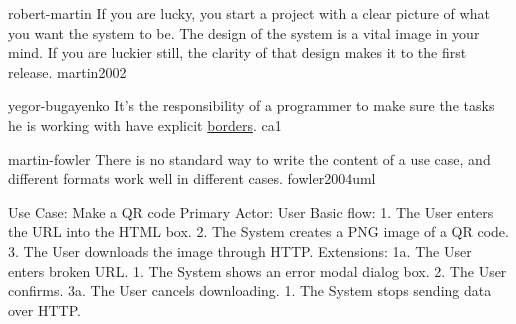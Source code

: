 \documentclass{article}
\begin{document}

\lnQuote
  {robert-martin}
  {If you are lucky, you start a project with a clear picture of what you want the system to be. The design of the system is a vital image in your mind. If you are luckier still, the clarity of that design makes it to the first release.}
  {martin2002}

\lnQuote
  {yegor-bugayenko}
  {It's the responsibility of a programmer to make sure the tasks he is working with have explicit \ul{borders}.}
  {ca1}

\pptToc



\lnQuote
  {martin-fowler}
  {There is no standard way to write the content of a use case, and different formats work well in different cases.}
  {fowler2004uml}

\begin{lnSnippet}
Use Case: Make a QR code
Primary Actor: User
Basic flow:
  1. The User enters the URL into the HTML box.
  2. The System creates a PNG image of a QR code.
  3. The User downloads the image through HTTP.
Extensions:
  1a. The User enters broken URL.
    1. The System shows an error modal dialog box.
    2. The User confirms.
  3a. The User cancels downloading.
    1. The System stops sending data over HTTP.
\end{lnSnippet}



\end{document}
